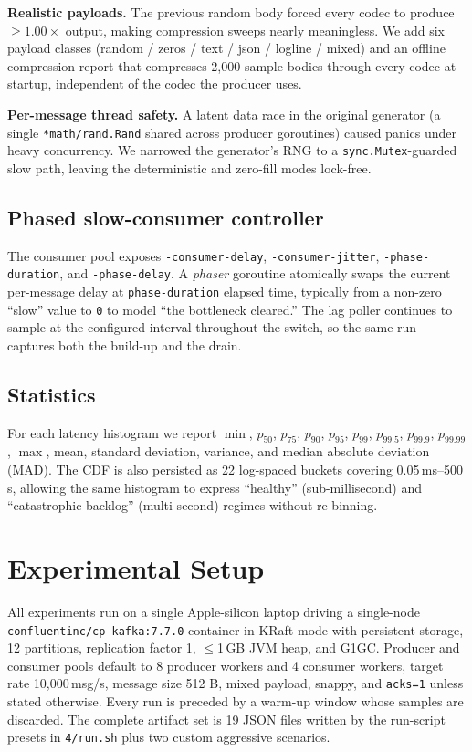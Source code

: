 \documentclass[conference]{IEEEtran}
\begin{document}
\textbf{Realistic payloads.} The previous random body forced every
codec to produce $\ge$$1.00\times$ output, making compression sweeps
nearly meaningless. We add six payload classes
(random / zeros / text / json / logline / mixed) and an offline
compression report that compresses 2{,}000 sample bodies through every
codec at startup, independent of the codec the producer uses.

\textbf{Per-message thread safety.} A latent data race in the original
generator (a single \texttt{*math/rand.Rand} shared across producer
goroutines) caused panics under heavy concurrency. We narrowed the
generator's RNG to a \texttt{sync.Mutex}-guarded slow path, leaving
the deterministic and zero-fill modes lock-free.

\subsection{Phased slow-consumer controller}
The consumer pool exposes
\texttt{-consumer-delay},
\texttt{-consumer-jitter},
\texttt{-phase-duration}, and
\texttt{-phase-delay}. A \emph{phaser} goroutine atomically swaps the
current per-message delay at \texttt{phase-duration} elapsed time,
typically from a non-zero ``slow'' value to \texttt{0} to model
``the bottleneck cleared.'' The lag poller continues to sample at the
configured interval throughout the switch, so the same run captures
both the build-up and the drain.

\subsection{Statistics}
For each latency histogram we report
$\min$, $p_{50}$, $p_{75}$, $p_{90}$, $p_{95}$, $p_{99}$, $p_{99.5}$,
$p_{99.9}$, $p_{99.99}$, $\max$, mean, standard deviation, variance,
and median absolute deviation (MAD). The CDF is also persisted as
22 log-spaced buckets covering 0.05\,ms--500\,s, allowing the same
histogram to express ``healthy'' (sub-millisecond) and ``catastrophic
backlog'' (multi-second) regimes without re-binning.

\section{Experimental Setup}
All experiments run on a single Apple-silicon laptop driving a
single-node \texttt{confluentinc/cp-kafka:7.7.0} container in KRaft
mode with persistent storage, 12 partitions, replication factor
1, $\le$1\,GB JVM heap, and G1GC. Producer and consumer pools
default to 8 producer workers and 4 consumer workers, target rate
10{,}000\,msg/s, message size 512 B, mixed payload, snappy, and
\texttt{acks=1} unless stated otherwise. Every run is preceded by a
warm-up window whose samples are discarded. The complete artifact
set is 19 JSON files written by the run-script presets in
\texttt{4/run.sh} plus two custom aggressive scenarios.
\end{document}
